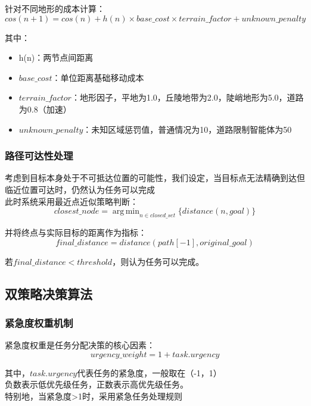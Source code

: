 \documentclass[12pt,a4paper]{article}
\DeclareMathOperator*{\argmin}{arg\,min}
\begin{document}
针对不同地形的成本计算：
\begin{equation}
cos(n+1) = cos(n) + h(n) \times base\_cost \times terrain\_factor + unknown\_penalty
\end{equation}

其中：
\begin{itemize}
\item h(n)：两节点间距离
\item $base\_cost$：单位距离基础移动成本
\item $terrain\_factor$：地形因子，平地为1.0，丘陵地带为2.0，陡峭地形为5.0，道路为0.8（加速）
\item $unknown\_penalty$：未知区域惩罚值，普通情况为10，道路限制智能体为50
\end{itemize}

\subsubsection{路径可达性处理}
考虑到目标本身处于不可抵达位置的可能性，我们设定，当目标点无法精确到达但临近位置可达时，仍然认为任务可以完成\\
此时系统采用最近点近似策略判断：
\begin{equation}
closest\_node = \argmin_{n \in closed\_set} \{distance(n, goal)\}
\end{equation}

并将终点与实际目标的距离作为指标：
\begin{equation}
final\_distance = distance(path[-1], original\_goal)
\end{equation}

若$final\_distance < threshold$，则认为任务可以完成。

\subsection{双策略决策算法}

\subsubsection{紧急度权重机制}
紧急度权重是任务分配决策的核心因素：
\begin{equation}
urgency\_weight = 1 + task.urgency
\end{equation}

其中，$task.urgency$代表任务的紧急度，一般取在（-1，1）\\
负数表示低优先级任务，正数表示高优先级任务。\\
特别地，当紧急度>1时，采用紧急任务处理规则
\end{document}
